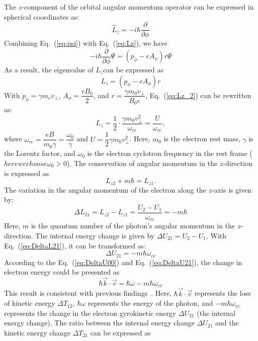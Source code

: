 \documentclass{cpbtex3}
\begin{document}
The $z$-component of the orbital angular momentum operator can be expressed in spherical coordinates as:
\begin{equation}
\hat{L}_z = -i\hbar\frac{\partial}{\partial\phi}  \label{eq:Lz}
\end{equation}
Combining Eq.~(\ref{eq:psi}) with Eq.~(\ref{eq:Lz}), we have 
\begin{equation}
-i\hbar \frac{\partial}{\partial \phi} \Psi = (p_\phi - eA_\phi) r \Psi
\end{equation}
As a result, the eigenvalue of  $L_z $can be expressed as
\begin{equation}
L_z = (p_\phi - e A_\phi) r  \label{eq:Lz_2}
\end{equation}
With \( p_\phi = \gamma m_e v_\perp \), \( A_\phi = \dfrac{r B_0}{2} \), and \( r = \dfrac{\gamma m_0 v_\perp}{B_0 e} \), Eq.~(\ref{eq:Lz_2}) can be rewritten as:
\begin{equation}
L_z = \frac{1}{2} \cdot \frac{\gamma m_0 v_\perp^2}{\omega_{ce}} = \frac{U}{\omega_{ce}},
\end{equation}
where \(\omega_{ce} = \dfrac{eB}{m_0 \gamma} = \dfrac{\omega_0}{\gamma}\) and \(U = \dfrac{1}{2} \gamma m_0 v_\perp^2\).
Here, \( m_0 \) is the electron rest mass, \( \gamma \) is the Lorentz factor, and \( \omega_0 \) is the electron cyclotron frequency in the rest frame (\( here we choose \omega_0 > 0 \)). The conservation of angular momentum in the \( z \)-direction is expressed as
\[
L_{z2} + m\hbar = L_{z1}.
\]
The variation in the angular momentum of the electron along the \( z \)-axis is given by:
\begin{equation}
\Delta L_{21} = L_{z2} - L_{z1} = \frac{U_2 - U_1}{\omega_{ce}} = -m\hbar \label{eq:DeltaL21}
\end{equation}
Here, \( m \) is the quantum number of the photon's angular momentum in the \( z \)-direction. The internal energy change is given by \( \Delta U_{21} = U_2 - U_1 \). With Eq.~(\ref{eq:DeltaL21}), it can be transformed as:
\begin{equation}
\Delta U_{21}=-m \hbar \omega_{ce}  \label{eq:DeltaU21}
\end{equation}
According to the Eq.~(\ref{eq:DeltaU00})  and Eq.~(\ref{eq:DeltaU21}), the change in electron energy  could be presented as 
\begin{equation}
\hbar \vec{k} \cdot \vec{v} = \hbar \omega - m \hbar \omega_{ce} \label{eq:EnergyResonant}
\end{equation}
This result is consistent with previous findings~\cite{tamm1959general, frank1960optics, nezlin1976negative, coppi1976slide, frolov1986excitation, ginzburg1996radiation}. Here, \( \hbar \vec{k} \cdot \vec{v} \) represents the loss of kinetic energy \( \Delta T_{12} \), \( \hbar \omega \) represents the energy of the photon, and \( -m \hbar \omega_{ce} \) represents the change in the electron gyrokinetic energy \( \Delta U_{21} \) (the internal energy change). The ratio between the internal energy change \( \Delta U_{21} \) and the kinetic energy change \( \Delta T_{21} \) can be expressed as
\end{document}
